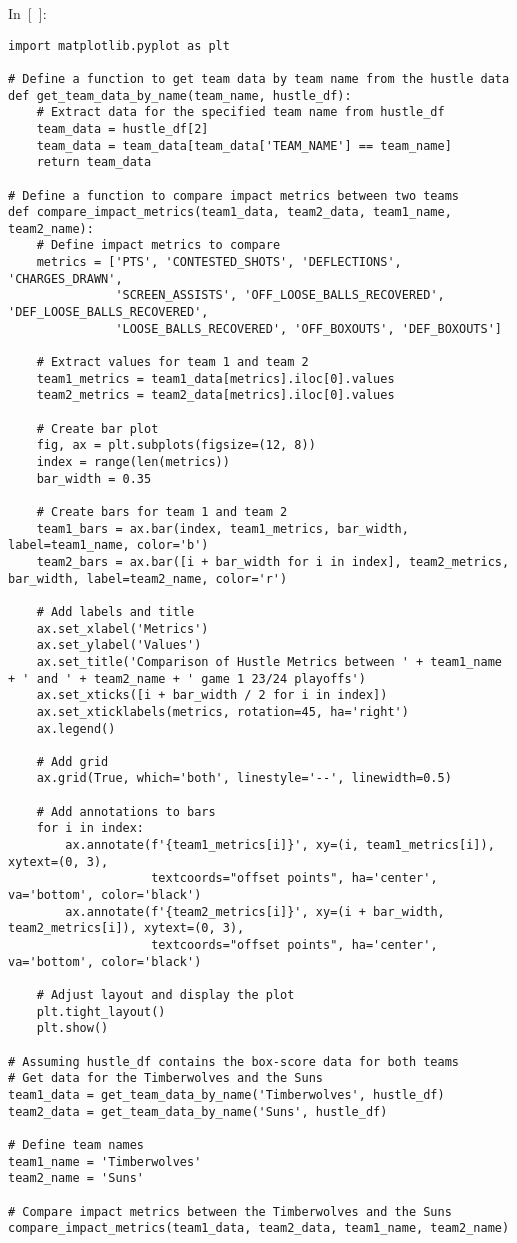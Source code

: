 In~{[}~{]}:

\begin{verbatim}
import matplotlib.pyplot as plt

# Define a function to get team data by team name from the hustle data
def get_team_data_by_name(team_name, hustle_df):
    # Extract data for the specified team name from hustle_df
    team_data = hustle_df[2]
    team_data = team_data[team_data['TEAM_NAME'] == team_name]
    return team_data

# Define a function to compare impact metrics between two teams
def compare_impact_metrics(team1_data, team2_data, team1_name, team2_name):
    # Define impact metrics to compare
    metrics = ['PTS', 'CONTESTED_SHOTS', 'DEFLECTIONS', 'CHARGES_DRAWN', 
               'SCREEN_ASSISTS', 'OFF_LOOSE_BALLS_RECOVERED', 'DEF_LOOSE_BALLS_RECOVERED',
               'LOOSE_BALLS_RECOVERED', 'OFF_BOXOUTS', 'DEF_BOXOUTS']

    # Extract values for team 1 and team 2
    team1_metrics = team1_data[metrics].iloc[0].values
    team2_metrics = team2_data[metrics].iloc[0].values

    # Create bar plot
    fig, ax = plt.subplots(figsize=(12, 8))
    index = range(len(metrics))
    bar_width = 0.35

    # Create bars for team 1 and team 2
    team1_bars = ax.bar(index, team1_metrics, bar_width, label=team1_name, color='b')
    team2_bars = ax.bar([i + bar_width for i in index], team2_metrics, bar_width, label=team2_name, color='r')

    # Add labels and title
    ax.set_xlabel('Metrics')
    ax.set_ylabel('Values')
    ax.set_title('Comparison of Hustle Metrics between ' + team1_name + ' and ' + team2_name + ' game 1 23/24 playoffs')
    ax.set_xticks([i + bar_width / 2 for i in index])
    ax.set_xticklabels(metrics, rotation=45, ha='right')
    ax.legend()

    # Add grid
    ax.grid(True, which='both', linestyle='--', linewidth=0.5)

    # Add annotations to bars
    for i in index:
        ax.annotate(f'{team1_metrics[i]}', xy=(i, team1_metrics[i]), xytext=(0, 3),
                    textcoords="offset points", ha='center', va='bottom', color='black')
        ax.annotate(f'{team2_metrics[i]}', xy=(i + bar_width, team2_metrics[i]), xytext=(0, 3),
                    textcoords="offset points", ha='center', va='bottom', color='black')

    # Adjust layout and display the plot
    plt.tight_layout()
    plt.show()

# Assuming hustle_df contains the box-score data for both teams
# Get data for the Timberwolves and the Suns
team1_data = get_team_data_by_name('Timberwolves', hustle_df)
team2_data = get_team_data_by_name('Suns', hustle_df)

# Define team names
team1_name = 'Timberwolves'
team2_name = 'Suns'

# Compare impact metrics between the Timberwolves and the Suns
compare_impact_metrics(team1_data, team2_data, team1_name, team2_name)
\end{verbatim}

